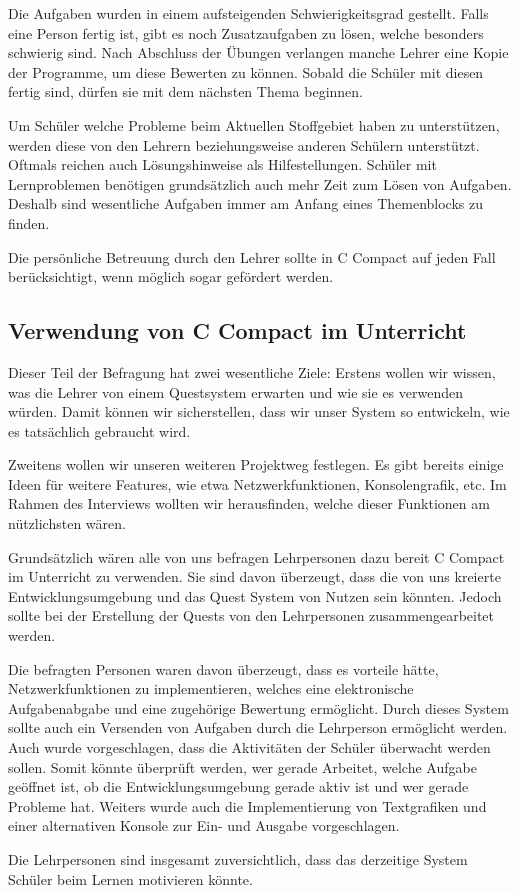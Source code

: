 Die Aufgaben wurden in einem aufsteigenden Schwierigkeitsgrad gestellt. Falls eine Person fertig ist, gibt es noch Zusatzaufgaben zu lösen, welche besonders schwierig sind. Nach Abschluss der Übungen verlangen manche Lehrer eine Kopie der Programme, um diese Bewerten zu können. Sobald die Schüler mit diesen fertig sind, dürfen sie mit dem nächsten Thema beginnen.

Um Schüler welche Probleme beim Aktuellen Stoffgebiet haben zu unterstützen, werden diese von den Lehrern beziehungsweise anderen Schülern unterstützt. Oftmals reichen auch Lösungshinweise als Hilfestellungen. Schüler mit Lernproblemen benötigen grundsätzlich auch mehr Zeit zum Lösen von Aufgaben. Deshalb sind wesentliche Aufgaben immer am Anfang eines Themenblocks zu finden.

Die persönliche Betreuung durch den Lehrer sollte in C Compact auf jeden Fall berücksichtigt, wenn möglich sogar gefördert werden.

\subsection{Verwendung von C Compact im Unterricht}
Dieser Teil der Befragung hat zwei wesentliche Ziele: Erstens wollen wir wissen, was die Lehrer von einem Questsystem erwarten und wie sie es verwenden würden. Damit können wir sicherstellen, dass wir unser System so entwickeln, wie es tatsächlich gebraucht wird.

Zweitens wollen wir unseren weiteren Projektweg festlegen. Es gibt bereits einige Ideen für weitere Features, wie etwa Netzwerkfunktionen, Konsolengrafik, etc. Im Rahmen des Interviews wollten wir herausfinden, welche dieser Funktionen am nützlichsten wären.

Grundsätzlich wären alle von uns befragen Lehrpersonen dazu bereit C Compact im Unterricht zu verwenden. Sie sind davon überzeugt, dass die von uns kreierte Entwicklungsumgebung und das Quest System von Nutzen sein könnten. Jedoch sollte bei der Erstellung der Quests von den Lehrpersonen zusammengearbeitet werden.

Die befragten Personen waren davon überzeugt, dass es vorteile hätte, Netzwerkfunktionen zu implementieren, welches eine elektronische Aufgabenabgabe und eine zugehörige Bewertung ermöglicht. Durch dieses System sollte auch ein Versenden von Aufgaben durch die Lehrperson ermöglicht werden. Auch wurde vorgeschlagen, dass die Aktivitäten der Schüler überwacht werden sollen. Somit könnte überprüft werden, wer gerade Arbeitet, welche Aufgabe geöffnet ist, ob die Entwicklungsumgebung gerade aktiv ist und wer gerade Probleme hat. Weiters wurde auch die Implementierung von Textgrafiken und einer alternativen Konsole zur Ein- und Ausgabe vorgeschlagen.

Die Lehrpersonen sind insgesamt zuversichtlich, dass das derzeitige System Schüler beim Lernen motivieren könnte.
